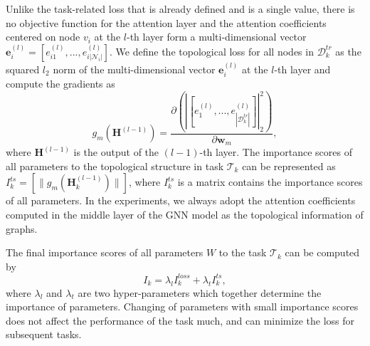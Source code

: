 \documentclass[letterpaper]{article} %
\begin{document}
Unlike the task-related loss that is already defined and is a single value,
there is no objective function for the attention layer and
the attention coefficients centered on node $v_i$ at the $l$-th layer form a multi-dimensional vector $\boldsymbol{e}_i^{(l)} =[ e_{i1}^{(l)},..., e_{i |\mathcal{N}_i |}^{(l)}]$.  %
We define the topological loss for all nodes in $\mathcal{D}_k^{tr}$ as the squared $l_2$ norm of the multi-dimensional vector $\boldsymbol{e}_i^{(l)}$ at the $l$-th layer
and compute the gradients as
\begin{equation}
\label{vi}
  g_m(\boldsymbol{H}^{(l-1)})=\frac{\partial \left ( \left| [e_1^{(l)},...,e_{|\mathcal{D}_k^{tr}|}^{(l)}] \right |_2^2 \right ) }{\partial{\boldsymbol{w}_m}},
\end{equation}
\noindent
where $\boldsymbol{H}^{(l-1)}$ is the output of the $(l-1)$-th layer.
The importance scores of all parameters
to the topological structure in task $\mathcal{T}_k$
can be represented as
$I_{k}^{ts}=[ \|g_m(\boldsymbol{H}_k^{(l-1)}) \|]$,
where $I_{k}^{ts}$ is a matrix contains the importance scores of all parameters.
In the experiments, we always adopt the attention coefficients
computed in the middle layer of the GNN model
as the topological information of graphs.

The final importance scores of all parameters $W$ to the task $\mathcal{T}_k$ can be computed by
\begin{equation}
\label{Ik}
    I_k =\lambda_l I_{k}^{loss} + \lambda_t I_k^{ts},
\end{equation}
\noindent where $\lambda_l$ and $\lambda_t$ are two hyper-parameters which together determine the importance of parameters.
Changing of parameters with small importance scores
does not affect the performance of the task much,
and can minimize the loss for subsequent tasks.
\end{document}
